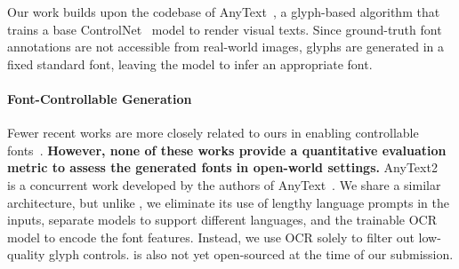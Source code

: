 Our work builds upon the codebase of AnyText~\cite{tuo2023anytext}, a glyph-based algorithm that trains a base ControlNet~\cite{zhang2023adding} model to render visual texts.
Since ground-truth font annotations are not accessible from real-world images, glyphs are generated in a fixed standard font, leaving the model to infer an appropriate font.


\paragraph{Font-Controllable Generation} Fewer recent works are more closely related to ours in enabling controllable fonts~\cite{tuo2024anytext2, ma2024glyphdraw2, li2024joytype, shi2024fonts, paliwal2024customtext, liu2025glyph}. \textbf{However, none of these works provide a quantitative evaluation metric to assess the generated fonts in open-world settings.} AnyText2~\cite{tuo2024anytext2} is a concurrent work developed by the authors of AnyText~\cite{tuo2023anytext}. We share a similar architecture, but unlike \cite{tuo2024anytext2}, we eliminate its use of lengthy language prompts in the inputs, separate models to support different languages, and the trainable OCR model to encode the font features. Instead, we use OCR solely to filter out low-quality glyph controls. \citet{tuo2024anytext2} is also not yet open-sourced at the time of our submission.






